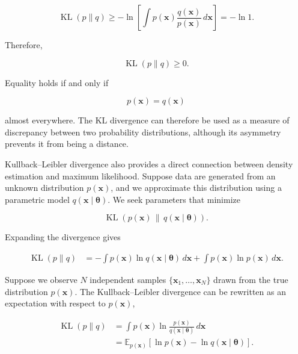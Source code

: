 \documentclass[10pt,twocolumn]{memoir}
\begin{document}
\begin{equation}
    \operatorname{KL}(p\|q) \geq -\ln\left[\int p(\mathbf{x})\frac{q(\mathbf{x})}{p(\mathbf{x})}\,d\mathbf{x}\right] = -\ln 1.
\end{equation}

Therefore,

\begin{equation}
    \operatorname{KL}(p\|q)\geq 0.
\end{equation}

Equality holds if and only if

\begin{equation}
    p(\mathbf{x})=q(\mathbf{x})
\end{equation}

almost everywhere. The KL divergence can therefore be used as a measure of discrepancy between two probability distributions, although its asymmetry prevents it from being a distance.

Kullback--Leibler divergence also provides a direct connection between density estimation and maximum likelihood. Suppose data are generated from an unknown distribution $p(\mathbf{x})$, and we approximate this distribution using a parametric model $q(\mathbf{x}\mid\boldsymbol{\theta})$. We seek parameters that minimize

\begin{equation}
    \operatorname{KL}\left(p(\mathbf{x})\,\|\,q(\mathbf{x}\mid\boldsymbol{\theta})\right).
\end{equation}

Expanding the divergence gives

\begin{equation}
\begin{aligned}
    \operatorname{KL}(p\|q)
    &=-\int p(\mathbf{x})\ln q(\mathbf{x}\mid\boldsymbol{\theta})\,d\mathbf{x} + \int p(\mathbf{x})\ln p(\mathbf{x})\,d\mathbf{x}.
\end{aligned}
\end{equation}

Suppose we observe $N$ independent samples $\{\mathbf{x}_1,\ldots,\mathbf{x}_N\}$ drawn from the true distribution $p(\mathbf{x})$. The Kullback--Leibler divergence can be rewritten as an expectation with respect to $p(\mathbf{x})$,

\begin{equation}
\begin{aligned}
    \operatorname{KL}(p\|q)
    &=\int p(\mathbf{x})\ln\frac{p(\mathbf{x})}{q(\mathbf{x}\mid\boldsymbol{\theta})}\,d\mathbf{x} \\
    &=\mathbb{E}_{p(\mathbf{x})}\left[\ln p(\mathbf{x}) - \ln q(\mathbf{x}\mid\boldsymbol{\theta})\right].
\end{aligned}
\end{equation}
\end{document}
